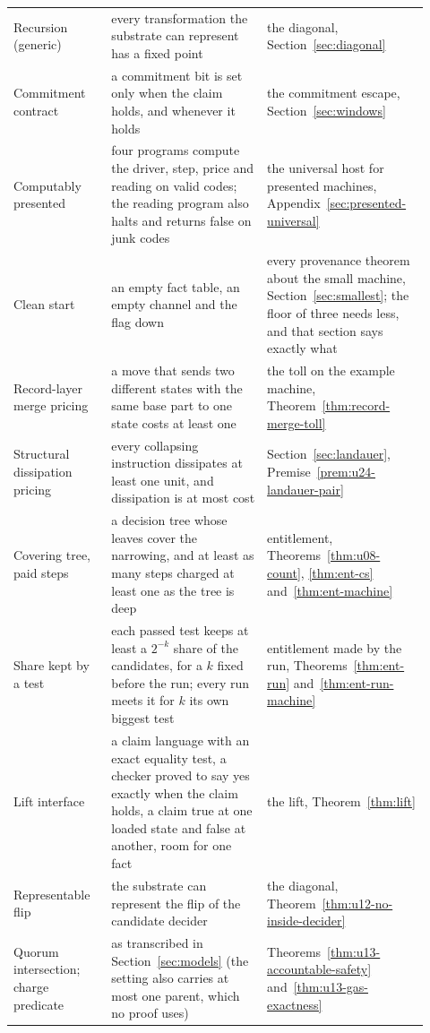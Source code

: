 \documentclass[11pt,twoside]{article}
\theoremstyle{thielethm}
\theoremstyle{thieledef}
\theoremstyle{thieledef}
\theoremstyle{thieledef}
\theoremstyle{thielethm}
\theoremstyle{thieleobs}
\theoremstyle{thielethm}
\begin{document}
\begin{longtable}{@{}>{\raggedright\arraybackslash}p{0.22\linewidth}>{\raggedright\arraybackslash}p{0.35\linewidth}>{\raggedright\arraybackslash}p{0.35\linewidth}@{}}
Recursion (generic) & every transformation the substrate can represent has a fixed point & the diagonal, Section~\ref{sec:diagonal} \\
Commitment contract & a commitment bit is set only when the claim holds, and whenever it holds & the commitment escape, Section~\ref{sec:windows} \\
Computably presented & four programs compute the driver, step, price and reading on valid codes; the reading program also halts and returns false on junk codes & the universal host for presented machines, Appendix~\ref{sec:presented-universal} \\
Clean start & an empty fact table, an empty channel and the flag down & every provenance theorem about the small machine, Section~\ref{sec:smallest}; the floor of three needs less, and that section says exactly what \\
Record-layer merge pricing & a move that sends two different states with the same base part to one state costs at least one & the toll on the example machine, Theorem~\ref{thm:record-merge-toll} \\
Structural dissipation pricing & every collapsing instruction dissipates at least one unit, and dissipation is at most cost & Section~\ref{sec:landauer}, Premise~\ref{prem:u24-landauer-pair} \\
Covering tree, paid steps & a decision tree whose leaves cover the narrowing, and at least as many steps charged at least one as the tree is deep & entitlement, Theorems~\ref{thm:u08-count}, \ref{thm:ent-cs} and~\ref{thm:ent-machine} \\
Share kept by a test & each passed test keeps at least a $2^{-k}$ share of the candidates, for a $k$ fixed before the run; every run meets it for $k$ its own biggest test & entitlement made by the run, Theorems~\ref{thm:ent-run} and~\ref{thm:ent-run-machine} \\
Lift interface & a claim language with an exact equality test, a checker proved to say yes exactly when the claim holds, a claim true at one loaded state and false at another, room for one fact & the lift, Theorem~\ref{thm:lift} \\

Representable flip & the substrate can represent the flip of the candidate decider & the diagonal, Theorem~\ref{thm:u12-no-inside-decider} \\
Quorum intersection; charge predicate & as transcribed in Section~\ref{sec:models} (the setting also carries at most one parent, which no proof uses) & Theorems~\ref{thm:u13-accountable-safety} and~\ref{thm:u13-gas-exactness} \\
\end{longtable}
\endgroup
\end{document}
